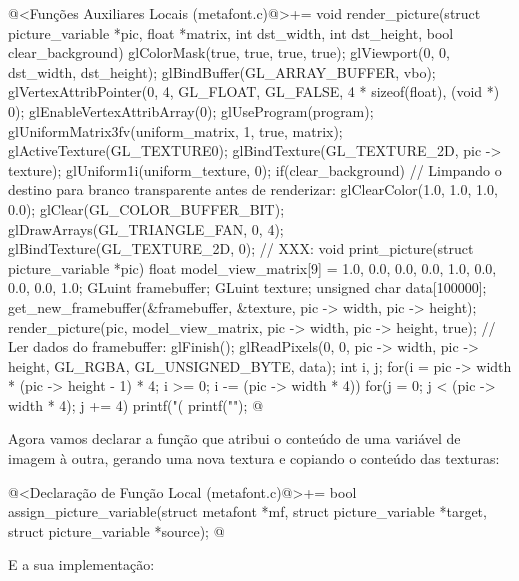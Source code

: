 {{{{{{\iniciocodigo
@<Funções Auxiliares Locais (metafont.c)@>+=
void render_picture(struct picture_variable *pic, float *matrix, int dst_width,
                    int dst_height, bool clear_background){
  glColorMask(true, true, true, true);
  glViewport(0, 0, dst_width, dst_height);
  glBindBuffer(GL_ARRAY_BUFFER, vbo);
  glVertexAttribPointer(0, 4, GL_FLOAT, GL_FALSE, 4 * sizeof(float), (void *) 0);
  glEnableVertexAttribArray(0);
  glUseProgram(program);
  glUniformMatrix3fv(uniform_matrix, 1, true, matrix);
  glActiveTexture(GL_TEXTURE0);
  glBindTexture(GL_TEXTURE_2D, pic -> texture);
  glUniform1i(uniform_texture, 0);
  if(clear_background){
    // Limpando o destino para branco transparente antes de renderizar:
    glClearColor(1.0, 1.0, 1.0, 0.0);
    glClear(GL_COLOR_BUFFER_BIT);
  }
  glDrawArrays(GL_TRIANGLE_FAN, 0, 4);
  glBindTexture(GL_TEXTURE_2D, 0);
}
// XXX:
void print_picture(struct picture_variable *pic){
  float model_view_matrix[9] = {1.0, 0.0, 0.0,
                               0.0, 1.0, 0.0,
                               0.0, 0.0, 1.0};
  GLuint framebuffer;
  GLuint texture;
  unsigned char data[100000];
  get_new_framebuffer(&framebuffer, &texture, pic -> width, pic -> height);
  render_picture(pic, model_view_matrix, pic -> width, pic -> height, true);
  // Ler dados do framebuffer:
  glFinish();
  glReadPixels(0, 0, pic -> width, pic -> height, GL_RGBA, GL_UNSIGNED_BYTE, data);
  {
    int i, j;
    for(i = pic -> width * (pic -> height - 1) * 4;
        i >= 0; i -= (pic -> width * 4)){
      for(j = 0; j < (pic -> width * 4); j += 4)
        printf("(%
        printf("\n");
    }
  }
}
@
\fimcodigo

Agora vamos declarar a função que atribui o conteúdo de uma variável
de imagem à outra, gerando uma nova textura e copiando o conteúdo das
texturas:

\iniciocodigo
@<Declaração de Função Local (metafont.c)@>+=
bool assign_picture_variable(struct metafont *mf,
                             struct picture_variable *target,
                             struct picture_variable *source);
@
\fimcodigo

E a sua implementação:

}}}}}}
